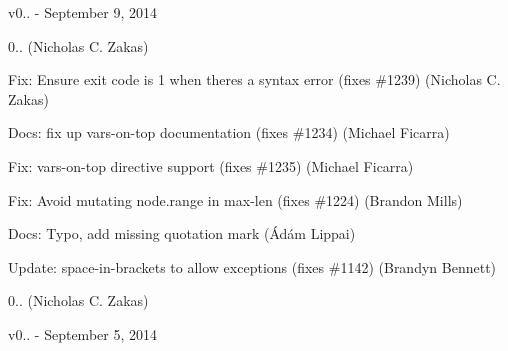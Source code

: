 v0.. -\/ September 9, 2014


\begin{DoxyItemize}
\item 0.. (Nicholas C. Zakas)
\item Fix\+: Ensure exit code is 1 when there\textquotesingle{}s a syntax error (fixes \#1239) (Nicholas C. Zakas)
\item Docs\+: fix up vars-\/on-\/top documentation (fixes \#1234) (Michael Ficarra)
\item Fix\+: vars-\/on-\/top directive support (fixes \#1235) (Michael Ficarra)
\item Fix\+: Avoid mutating node.\+range in max-\/len (fixes \#1224) (Brandon Mills)
\item Docs\+: Typo, add missing quotation mark (Ádám Lippai)
\item Update\+: space-\/in-\/brackets to allow exceptions (fixes \#1142) (Brandyn Bennett)
\item 0.. (Nicholas C. Zakas)
\end{DoxyItemize}

v0.. -\/ September 5, 2014


